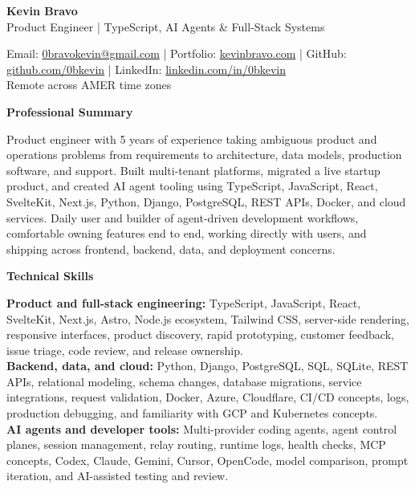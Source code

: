 \documentclass[10pt]{article}
\newcommand{\sectiontitle}[1]{%
    \vspace{3pt}
    \begin{center}
        \textbf{#1}
    \end{center}
    \vspace{-7pt}
}
\begin{document}
\raggedright

\begin{center}
    {\LARGE \textbf{Kevin Bravo}}\\
    Product Engineer | TypeScript, AI Agents \& Full-Stack Systems \\
    \hrulefill
\end{center}

\begin{center}
    Email: \href{mailto:0bravokevin@gmail.com}{0bravokevin@gmail.com}
    | Portfolio: \href{https://kevinbravo.com}{kevinbravo.com}
    | GitHub: \href{https://github.com/0bkevin}{github.com/0bkevin}
    | LinkedIn: \href{https://www.linkedin.com/in/0bkevin/}{linkedin.com/in/0bkevin} \\
    Remote across AMER time zones
\end{center}

\fontsize{9.6}{10.7}\selectfont

\sectiontitle{Professional Summary}
Product engineer with 5 years of experience taking ambiguous product and operations problems from requirements to architecture, data models, production software, and support. Built multi-tenant platforms, migrated a live startup product, and created AI agent tooling using TypeScript, JavaScript, React, SvelteKit, Next.js, Python, Django, PostgreSQL, REST APIs, Docker, and cloud services. Daily user and builder of agent-driven development workflows, comfortable owning features end to end, working directly with users, and shipping across frontend, backend, data, and deployment concerns.

\sectiontitle{Technical Skills}
\textbf{Product and full-stack engineering:} TypeScript, JavaScript, React, SvelteKit, Next.js, Astro, Node.js ecosystem, Tailwind CSS, server-side rendering, responsive interfaces, product discovery, rapid prototyping, customer feedback, issue triage, code review, and release ownership. \\
\textbf{Backend, data, and cloud:} Python, Django, PostgreSQL, SQL, SQLite, REST APIs, relational modeling, schema changes, database migrations, service integrations, request validation, Docker, Azure, Cloudflare, CI/CD concepts, logs, production debugging, and familiarity with GCP and Kubernetes concepts. \\
\textbf{AI agents and developer tools:} Multi-provider coding agents, agent control planes, session management, relay routing, runtime logs, health checks, MCP concepts, Codex, Claude, Gemini, Cursor, OpenCode, model comparison, prompt iteration, and AI-assisted testing and review.
\end{document}
